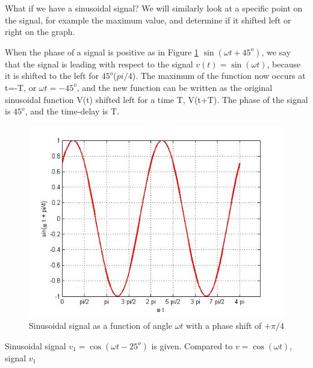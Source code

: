 \documentclass{ximera}
\begin{document}
\begin{example}

What if we have a sinusoidal signal? We will similarly look at a specific point on the signal, for example the maximum value, and determine if it shifted left or right on the graph.

When the phase of a signal is positive as in Figure \ref{sinPlus45Ph} $ \sin (\omega t + 45^o)$, we say that the signal is leading with respect to the signal $v(t)= \sin (\omega t)$, because it is shifted to the left for $45^o$($pi/4$). The maximum of the function now occurs at t=-T, or $\omega t = -45^o$, and the new function can be written as the original sinusoidal function V(t) shifted left for a time T,  V(t+T). The phase of the signal is $45^o$, and the time-delay is T. 


\begin{figure}[htbp]
\includegraphics[scale=0.4]{jpg/cpef5.jpg}
\caption{Sinusoidal signal as a function of angle $\omega t$ with a phase shift of $+\pi/4$}
\label{sinPlus45Ph}
\end{figure}

\end{example}



\begin{question}
Sinusoidal signal $v_1=\cos(\omega t - 25^o)$ is given. Compared to $v=\cos(\omega t)$, signal $v_1$
\begin{multipleChoice}  
\end{multipleChoice}
\end{question}
\end{document}
